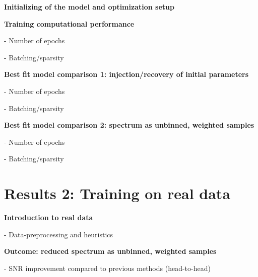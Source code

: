 \documentclass[twocolumn]{aastex63}
\begin{document}
\begin{mdframed}
  \textbf{Initializing of the model and optimization setup} \par
  \textcolor{lightgray}{\lipsum[10]}
\end{mdframed}


\begin{mdframed}
  \textbf{Training computational performance} \par
  - Number of epochs\par
  - Batching/sparsity\par
  \textcolor{lightgray}{\lipsum[9]}
\end{mdframed}

\begin{mdframed}
  \textbf{Best fit model comparison 1: injection/recovery of initial parameters} \par
  - Number of epochs\par
  - Batching/sparsity\par
  \textcolor{lightgray}{\lipsum[10]}
\end{mdframed}

\begin{mdframed}
  \textbf{Best fit model comparison 2: spectrum as unbinned, weighted samples} \par
  - Number of epochs\par
  - Batching/sparsity\par
  \textcolor{lightgray}{\lipsum[11]}
\end{mdframed}


\section{Results 2: Training on real data}
\begin{mdframed}
  \textbf{Introduction to real data} \par
  - Data-preprocessing and heuristics \par
  \textcolor{lightgray}{\lipsum[12]}
\end{mdframed}

\begin{mdframed}
  \textbf{Outcome: reduced spectrum as unbinned, weighted samples} \par
  - SNR improvement compared to previous methods (head-to-head)\par
  \textcolor{lightgray}{\lipsum[13]}
\end{mdframed}

\pagebreak
\clearpage
\end{document}
